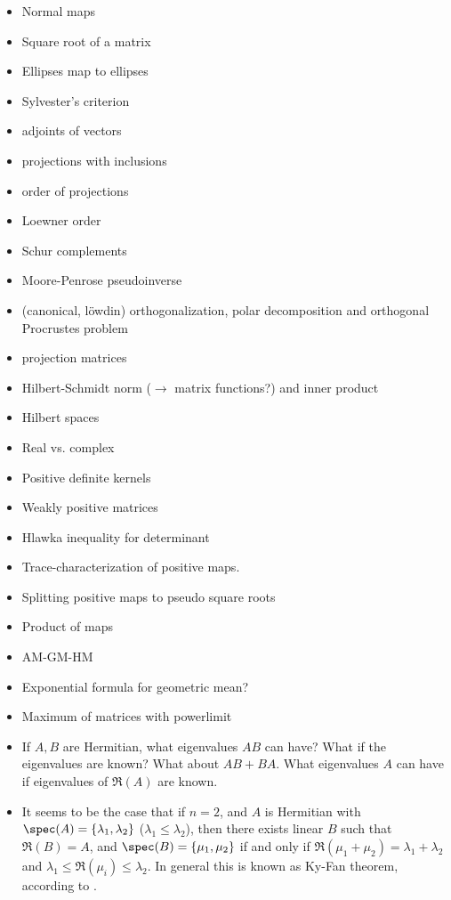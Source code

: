 \begin{itemize}
	\item Normal maps
	\item Square root of a matrix
	\item Ellipses map to ellipses
	\item Sylvester's criterion
	\item adjoints of vectors
	\item projections with inclusions
	\item order of projections
	\item Loewner order
	\item Schur complements
	\item Moore-Penrose pseudoinverse
	\item (canonical, löwdin) orthogonalization, polar decomposition and orthogonal Procrustes problem
	\item projection matrices
	\item Hilbert-Schmidt norm ($\to$ matrix functions?) and inner product
	\item Hilbert spaces
	\item Real vs. complex
	\item Positive definite kernels
	\item Weakly positive matrices
	\item Hlawka inequality for determinant %
	\item Trace-characterization of positive maps.
	\item Splitting positive maps to pseudo square roots
	\item Product of maps
	\item AM-GM-HM
	\item Exponential formula for geometric mean?
	\item Maximum of matrices with powerlimit
	\item If $A, B$ are Hermitian, what eigenvalues $AB$ can have? What if the eigenvalues are known? What about $AB + BA$. What eigenvalues $A$ can have if eigenvalues of $\Re(A)$ are known.
	\item It seems to be the case that if $n = 2$, and $A$ is Hermitian with $\spec(A) = \{\lambda_{1}, \lambda_{2}\}$ ($\lambda_{1} \leq \lambda_{2}$), then there exists linear $B$ such that $\Re(B) = A$, and $\spec(B) = \{\mu_{1}, \mu_{2} \}$ if and only if $\Re(\mu_{1} + \mu_{2}) = \lambda_{1} + \lambda_{2}$ and $\lambda_{1} \leq \Re(\mu_{i}) \leq \lambda_{2}$. In general this is known as Ky-Fan theorem, according to \cite{Ando3}.

\end{itemize}

